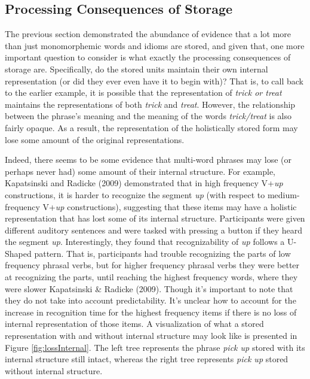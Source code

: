 \documentclass[
  man,floatsintext]{apa6}
\begin{document}
\subsection{Processing Consequences of Storage}\label{processing-consequences-of-storage}

The previous section demonstrated the abundance of evidence that a lot more than just monomorphemic words and idioms are stored, and given that, one more important question to consider is what exactly the processing consequences of storage are. Specifically, do the stored units maintain their own internal representation (or did they ever even have it to begin with)? That is, to call back to the earlier example, it is possible that the representation of \emph{trick or treat} maintains the representations of both \emph{trick} and \emph{treat}. However, the relationship between the phrase's meaning and the meaning of the words \emph{trick/treat} is also fairly opaque. As a result, the representation of the holistically stored form may lose some amount of the original representations.

Indeed, there seems to be some evidence that multi-word phrases may lose (or perhaps never had) some amount of their internal structure. For example, Kapatsinski and Radicke (2009) demonstrated that in high frequency V+\emph{up} constructions, it is harder to recognize the segment \emph{up} (with respect to medium-frequency V+\emph{up} constructions), suggesting that these items may have a holistic representation that has lost some of its internal structure. Participants were given different auditory sentences and were tasked with pressing a button if they heard the segment \emph{up}. Interestingly, they found that recognizability of \emph{up} follows a U-Shaped pattern. That is, participants had trouble recognizing the parts of low frequency phrasal verbs, but for higher frequency phrasal verbs they were better at recognizing the parts, until reaching the highest frequency words, where they were slower Kapatsinski \& Radicke (2009). Though it's important to note that they do not take into account predictability. It's unclear how to account for the increase in recognition time for the highest frequency items if there is no loss of internal representation of those items. A visualization of what a stored representation with and without internal structure may look like is presented in Figure \ref{fig:lossInternal}. The left tree represents the phrase \emph{pick up} stored with its internal structure still intact, whereas the right tree represents \emph{pick up} stored without internal structure.
\end{document}
